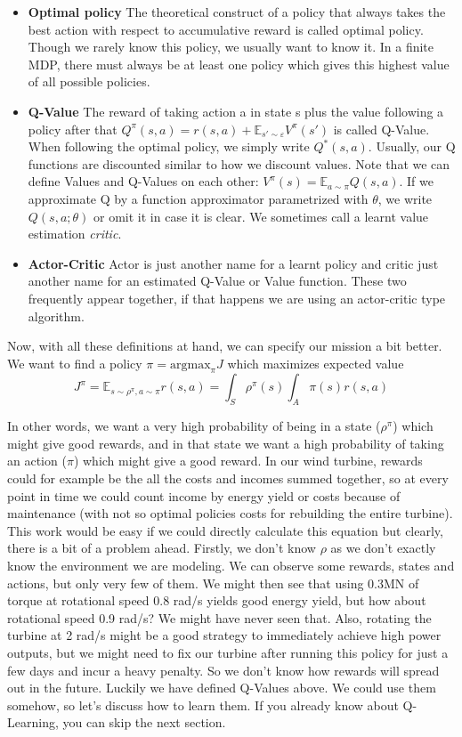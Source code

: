 \documentclass[hyperref,final,beleg]{cgvpub}
\begin{document}
\begin{itemize}
  \item \textbf{Optimal policy} The theoretical construct of a policy that always takes the best action with respect to accumulative reward is called optimal policy. Though we rarely know this policy, we usually want to know it. In a finite \ac{MDP}, there must always be at least one policy which gives this highest value of all possible policies.
  \item \textbf{Q-Value} The reward of taking action a in state s plus the value following a policy after that $Q^{\pi}(s,a) = r(s, a) + \mathbb{E}_{s' \sim \varepsilon} V^{\pi}(s')$ is called Q-Value. When following the optimal policy, we simply write $Q^*(s,a)$. Usually, our Q functions are discounted similar to how we discount values. Note that we can define Values and Q-Values on each other: $V^{\pi}(s) = \mathbb{E}_{a \sim \pi} Q(s, a)$. If we approximate Q by a function approximator parametrized with $\theta$, we write $Q(s, a;\theta)$ or omit it in case it is clear. We sometimes call a learnt value estimation \textit{critic}.
  \item \textbf{Actor-Critic} Actor is just another name for a learnt policy and critic just another name for an estimated Q-Value or Value function. These two frequently appear together, if that happens we are using an actor-critic type algorithm.

\end{itemize}

Now, with all these definitions at hand, we can specify our mission a bit better. We want to find a policy $\pi = \mathrm{argmax}_{\pi} J$ which maximizes expected value
\begin{equation}
J^{\pi} = \mathbb{E}_{s \sim \rho^{\pi}, a \sim \pi}r(s, a) = \int_S \rho^{\pi}(s) \int_A \pi(s) r(s, a)
\label{equ:maximize_rewards}
\end{equation}

In other words, we want a very high probability of being in a state ($\rho^{\pi}$) which might give good rewards, and in that state we want a high probability of taking an action ($\pi$) which might give a good reward. In our wind turbine, rewards could for example be the all the costs and incomes summed together, so at every point in time we could count income by energy yield or costs because of maintenance (with not so optimal policies costs for rebuilding the entire turbine). This work would be easy if we could directly calculate this equation but clearly, there is a bit of a problem ahead. Firstly, we don't know $\rho$ as we don't exactly know the environment we are modeling. We can observe some rewards, states and actions, but only very few of them. We might then see that using 0.3MN of torque at rotational speed 0.8 rad/s yields good energy yield, but how about rotational speed 0.9 rad/s? We might have never seen that. Also, rotating the turbine at 2 rad/s might be a good strategy to immediately achieve high power outputs, but we might need to fix our turbine after running this policy for just a few days and incur a heavy penalty. So we don't know how rewards will spread out in the future. Luckily we have defined Q-Values above. We could use them somehow, so let's discuss how to learn them. If you already know about Q-Learning, you can skip the next section.
\end{document}
